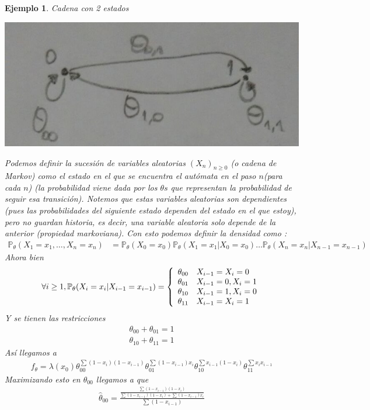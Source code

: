 \documentclass[10pt]{article}
\theoremstyle{plain}
\newtheorem{ej}{Ejemplo}
\theoremstyle{definition}
\begin{document}
\begin{ej} Cadena con 2 estados\\
\begin{center}
\includegraphics[scale=0.2]{imagenes/cadena.png}
\end{center}
Podemos definir la sucesión de variables aleatorias $(X_{n})_{n\ge 0}$ (o cadena de Markov) como el estado en el que se encuentra el autómata en el paso $n$(para cada $n$) (la probabilidad viene dada por los $\theta s$ que representan la probabilidad de seguir esa transición). Notemos que estas variables aleatorias son dependientes (pues las probabilidades del siguiente estado dependen del estado en el que estoy), pero no guardan historia, es decir, una variable aleatoria solo depende de la anterior (propiedad markoviana). Con esto podemos definir la densidad como :
\begin{align*}
\mathbb{P}_{\theta}(X_{1}=x_{1},\ldots,X_{n}=x_{n}) &= \mathbb{P}_{\theta}(X_{0}=x_{0})\mathbb{P}_{\theta}(X_{1}=x_{1}|X_{0}=x_{0})\ldots \mathbb{P}_{\theta}(X_{n}=x_{n}|X_{n-1}=x_{n-1})
\end{align*}
Ahora bien
\begin{align*}
\forall i \ge 1, \mathbb{P}_{\theta}(X_{i}=x_{i}|X_{i-1}=x_{i-1}) = \left\{
\begin{array}{c l}
 \theta_{00} & X_{i-1}=X_{i}=0\\
 \theta_{01} & X_{i-1}=0, X_{i}=1\\
 \theta_{10} & X_{i-1}=1, X_{i}=0\\
 \theta_{11} & X_{i-1}=X_{i}=1
\end{array}
\right.
\end{align*}
Y se tienen las restricciones
\begin{align*}
\theta_{00} + \theta_{01} = 1\\
\theta_{10} + \theta_{11} = 1
\end{align*}
Así llegamos a 
\begin{align*}
f_{\theta} = \lambda(x_{0}) \theta_{00}^{\sum (1-x_{i})(1-x_{i-1})} \theta_{01}^{\sum (1-x_{i-1})x_{i}}\theta_{10}^{\sum x_{i-1}(1-x_{i})} \theta_{11}^{\sum x_{i}x_{i-1}}
\end{align*}
Maximizando esto en $\theta_{00}$ llegamos a que
\begin{align*}
\hat{\theta}_{00} = \frac{\frac{\sum (1-x_{i-1})(1-x_{i})}{\sum (1-x_{i-1})(1-x_{i}) + \sum (1-x_{i-1})x_{i}}}{\sum (1-x_{i-1})}
\end{align*}
\end{ej}
\end{document}
